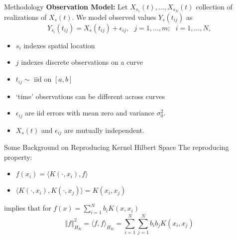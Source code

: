 \documentclass{beamer}
\renewcommand{\H}{\mathcal{H}}
\newcommand{\Real}{\ensuremath{ \mathbb{R} }}
\newcommand{\norm}[1]{\left\|#1\right\|}
\newcommand{\inner}[2]{\langle #1, #2 \rangle}
\begin{document}
\begin{frame}[t]{Methodology}
	\textbf{Observation Model:}
	Let $X_{s_1}(t), \dots, X_{s_N}(t)$ collection of realizations of $X_s(t)$.
	We model observed values $Y_s(t_{ij})$ as
	\begin{equation*}
		Y_{s_i}(t_{ij})=X_s(t_{ij})+\epsilon_{ij},\mbox{ }j=1,\dots,m;\mbox{ }i=1,\dots,N,
	\end{equation*}
	\begin{itemize}
		\item $s_i$ indexes spatial location
		\item $j$ indexes discrete observations on a curve
		\item $t_{ij} \sim \mbox{ iid on }[a,b]$
		\item `time' observations can be different across curves
		\item $\epsilon_{ij}$ are iid errors with mean zero and variance $\sigma_{0}^{2}.$
		\item $X_s(t)$ and $\epsilon_{ij}$ are mutually independent.
	\end{itemize}
\end{frame}


\begin{frame}{Some Background on Reproducing Kernel Hilbert Space}
The reproducing property:
\begin{itemize}
\item $f(x_i) = \inner{K(\cdot, x_i)}{f}$
\item $\inner{K(\cdot, x_i)}{K(\cdot, x_j)} = K(x_i, x_j)$
\end{itemize}
implies that for $f(x)=\sum_{i=1}^{N}b_{i}K(x,x_{i})$
\[\left\Vert f\right\Vert _{H_{K}}^{2}=\inner{f}{f}_{H_{K}}=\sum_{i=1}^{N}\sum_{j=1}^{N}b_{i}b_{j}K(x_{i},x_{j})\]
\end{frame}
\end{document}
